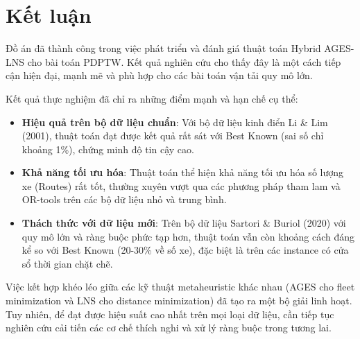 \documentclass[../DoAn.tex]{subfiles}
\begin{document}
    \section{Kết luận}

    Đồ án đã thành công trong việc phát triển và đánh giá thuật toán Hybrid AGES-LNS cho bài toán PDPTW. Kết quả nghiên cứu cho thấy đây là một cách tiếp cận hiện đại, mạnh mẽ và phù hợp cho các bài toán vận tải quy mô lớn.

    Kết quả thực nghiệm đã chỉ ra những điểm mạnh và hạn chế cụ thể:
    \begin{itemize}
        \item \textbf{Hiệu quả trên bộ dữ liệu chuẩn}: Với bộ dữ liệu kinh điển Li \& Lim (2001), thuật toán đạt được kết quả rất sát với Best Known (sai số chỉ khoảng 1\%), chứng minh độ tin cậy cao.
        \item \textbf{Khả năng tối ưu hóa}: Thuật toán thể hiện khả năng tối ưu hóa số lượng xe (Routes) rất tốt, thường xuyên vượt qua các phương pháp tham lam và OR-tools trên các bộ dữ liệu nhỏ và trung bình.
        \item \textbf{Thách thức với dữ liệu mới}: Trên bộ dữ liệu Sartori \& Buriol (2020) với quy mô lớn và ràng buộc phức tạp hơn, thuật toán vẫn còn khoảng cách đáng kể so với Best Known (20-30\% về số xe), đặc biệt là trên các instance có cửa sổ thời gian chặt chẽ.
    \end{itemize}

    Việc kết hợp khéo léo giữa các kỹ thuật metaheuristic khác nhau (AGES cho fleet minimization và LNS cho distance minimization) đã tạo ra một bộ giải linh hoạt. Tuy nhiên, để đạt được hiệu suất cao nhất trên mọi loại dữ liệu, cần tiếp tục nghiên cứu cải tiến các cơ chế thích nghi và xử lý ràng buộc trong tương lai.
\end{document}
